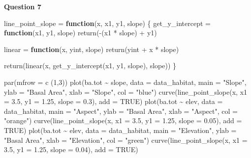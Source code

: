 \documentclass[
]{article}
\newenvironment{Shaded}{\begin{snugshade}}{\end{snugshade}}
\newcommand{\AttributeTok}[1]{\textcolor[rgb]{0.77,0.63,0.00}{#1}}
\newcommand{\ConstantTok}[1]{\textcolor[rgb]{0.00,0.00,0.00}{#1}}
\newcommand{\ControlFlowTok}[1]{\textcolor[rgb]{0.13,0.29,0.53}{\textbf{#1}}}
\newcommand{\DecValTok}[1]{\textcolor[rgb]{0.00,0.00,0.81}{#1}}
\newcommand{\FloatTok}[1]{\textcolor[rgb]{0.00,0.00,0.81}{#1}}
\newcommand{\FunctionTok}[1]{\textcolor[rgb]{0.00,0.00,0.00}{#1}}
\newcommand{\NormalTok}[1]{#1}
\newcommand{\OtherTok}[1]{\textcolor[rgb]{0.56,0.35,0.01}{#1}}
\newcommand{\SpecialCharTok}[1]{\textcolor[rgb]{0.00,0.00,0.00}{#1}}
\newcommand{\StringTok}[1]{\textcolor[rgb]{0.31,0.60,0.02}{#1}}
\begin{document}
\textbf{Question 7}

\begin{Shaded}
\begin{Highlighting}[]
\NormalTok{line\_point\_slope }\OtherTok{=} \ControlFlowTok{function}\NormalTok{(x, x1, y1, slope)}
\NormalTok{\{}
\NormalTok{  get\_y\_intercept }\OtherTok{=} 
    \ControlFlowTok{function}\NormalTok{(x1, y1, slope) }
      \FunctionTok{return}\NormalTok{(}\SpecialCharTok{{-}}\NormalTok{(x1 }\SpecialCharTok{*}\NormalTok{ slope) }\SpecialCharTok{+}\NormalTok{ y1)}
  
\NormalTok{  linear }\OtherTok{=} 
    \ControlFlowTok{function}\NormalTok{(x, yint, slope) }
      \FunctionTok{return}\NormalTok{(yint }\SpecialCharTok{+}\NormalTok{ x }\SpecialCharTok{*}\NormalTok{ slope)}
  
  \FunctionTok{return}\NormalTok{(}\FunctionTok{linear}\NormalTok{(x, }\FunctionTok{get\_y\_intercept}\NormalTok{(x1, y1, slope), slope))}
\NormalTok{\}}

\FunctionTok{par}\NormalTok{(}\AttributeTok{mfrow =} \FunctionTok{c}\NormalTok{ (}\DecValTok{1}\NormalTok{,}\DecValTok{3}\NormalTok{))}
\FunctionTok{plot}\NormalTok{(ba.tot }\SpecialCharTok{\textasciitilde{}}\NormalTok{ slope, }\AttributeTok{data =}\NormalTok{ data\_habitat, }\AttributeTok{main =} \StringTok{"Slope"}\NormalTok{, }\AttributeTok{ylab =} \StringTok{"Basal Area"}\NormalTok{, }\AttributeTok{xlab =} \StringTok{"Slope"}\NormalTok{, }\AttributeTok{col =} \StringTok{"blue"}\NormalTok{)}
\FunctionTok{curve}\NormalTok{(}\FunctionTok{line\_point\_slope}\NormalTok{(x, }\AttributeTok{x1 =} \FloatTok{3.5}\NormalTok{, }\AttributeTok{y1 =} \FloatTok{1.25}\NormalTok{, }\AttributeTok{slope =} \FloatTok{0.3}\NormalTok{), }\AttributeTok{add =} \ConstantTok{TRUE}\NormalTok{)}
\FunctionTok{plot}\NormalTok{(ba.tot }\SpecialCharTok{\textasciitilde{}}\NormalTok{ elev, }\AttributeTok{data =}\NormalTok{ data\_habitat, }\AttributeTok{main =} \StringTok{"Aspect"}\NormalTok{, }\AttributeTok{ylab =} \StringTok{"Basal Area"}\NormalTok{, }\AttributeTok{xlab =} \StringTok{"Aspect"}\NormalTok{, }\AttributeTok{col =} \StringTok{"orange"}\NormalTok{)}
\FunctionTok{curve}\NormalTok{(}\FunctionTok{line\_point\_slope}\NormalTok{(x, }\AttributeTok{x1 =} \FloatTok{3.5}\NormalTok{, }\AttributeTok{y1 =} \FloatTok{1.25}\NormalTok{, }\AttributeTok{slope =} \FloatTok{0.05}\NormalTok{), }\AttributeTok{add =} \ConstantTok{TRUE}\NormalTok{)}
\FunctionTok{plot}\NormalTok{(ba.tot }\SpecialCharTok{\textasciitilde{}}\NormalTok{ elev, }\AttributeTok{data =}\NormalTok{ data\_habitat, }\AttributeTok{main =} \StringTok{"Elevation"}\NormalTok{, }\AttributeTok{ylab =} \StringTok{"Basal Area"}\NormalTok{, }\AttributeTok{xlab =} \StringTok{"Elevation"}\NormalTok{, }\AttributeTok{col =} \StringTok{"green"}\NormalTok{)}
\FunctionTok{curve}\NormalTok{(}\FunctionTok{line\_point\_slope}\NormalTok{(x, }\AttributeTok{x1 =} \FloatTok{3.5}\NormalTok{, }\AttributeTok{y1 =} \FloatTok{1.25}\NormalTok{, }\AttributeTok{slope =} \FloatTok{0.04}\NormalTok{), }\AttributeTok{add =} \ConstantTok{TRUE}\NormalTok{)}
\end{Highlighting}
\end{Shaded}
\end{document}

